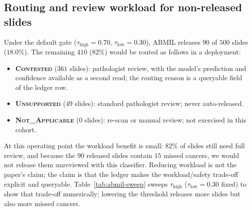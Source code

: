 \documentclass{article}
\newcommand{\SafeNum}[1]{#1}
\newcommand{\AggNum}[2]{#2}
\begin{document}
\subsection*{Routing and review workload for non-released slides}

Under the default gate ($\tau_{\text{high}}=\SafeNum{0.70}$, $\tau_{\text{low}}=\SafeNum{0.30}$), ABMIL releases $\AggNum{abmil.supported.n}{90}$ of $\SafeNum{500}$ slides ($\AggNum{abmil.sweep.tau070.coverage_pct}{18.0}\%$). The remaining $\SafeNum{410}$ ($\SafeNum{82}\%$) would be routed as follows in a deployment:
\begin{itemize}
  \item \textbf{\textsc{Contested}} ($\SafeNum{361}$ slides): pathologist review, with the model's prediction and confidence available as a second read; the routing reason is a queryable field of the ledger row.
  \item \textbf{\textsc{Unsupported}} ($\SafeNum{49}$ slides): standard pathologist review; never auto-released.
  \item \textbf{\textsc{Not\_Applicable}} ($\SafeNum{0}$ slides): re-scan or manual review; not exercised in this cohort.
\end{itemize}
At this operating point the workload benefit is small: $\SafeNum{82}\%$ of slides still need full review, and because the $\AggNum{abmil.supported.n}{90}$ released slides contain $\AggNum{abmil.supported.missed_cancer}{15}$ missed cancers, we would not release them unreviewed with this classifier. Reducing workload is not the paper's claim; the claim is that the ledger makes the workload/safety trade-off explicit and queryable. Table~\ref{tab:abmil-sweep} sweeps $\tau_{\text{high}}$ ($\tau_{\text{low}}=\SafeNum{0.30}$ fixed) to show that trade-off numerically; lowering the threshold releases more slides but also more missed cancers.
\end{document}
